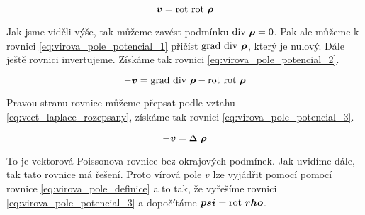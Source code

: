 \begin{equation}
\label{eq:virova_pole_potencial_1}
\boldsymbol{v} = \mathrm{rot} \ \mathrm{rot} \ \boldsymbol{\rho}
\end{equation}

Jak jsme viděli výše, tak můžeme zavést podmínku \(\mathrm{div} \ \boldsymbol{\rho} = 0\). Pak ale můžeme k rovnici \eqref{eq:virova_pole_potencial_1}
přičíst \(\grad \ \diverg \ \vect{\rho}\), který je nulový. Dále ještě rovnici invertujeme. Získáme tak rovnici \eqref{eq:virova_pole_potencial_2}.

\begin{equation}
\label{eq:virova_pole_potencial_2}
-\vect{v} = \grad \ \diverg \ \vect{\rho} - \rot \ \rot \ \vect{\rho}
\end{equation}

Pravou stranu rovnice můžeme přepsat podle vztahu \eqref{eq:vect_laplace_rozepsany}, získáme tak rovnici \eqref{eq:virova_pole_potencial_3}.

\begin{equation}
\label{eq:virova_pole_potencial_3}
-\boldsymbol{v} = \Delta \ \boldsymbol{\rho}
\end{equation}

To je vektorová Poissonova rovnice bez okrajových podmínek. Jak uvidíme dále, tak tato rovnice má řešení. Proto vírová pole \(v\) lze vyjádřit
pomocí pomocí rovnice \eqref{eq:virova_pole_definice} a to tak, že vyřešíme rovnici \eqref{eq:virova_pole_potencial_3} a dopočítáme \(\vect{psi} = \rot \ \vect{rho}\).

